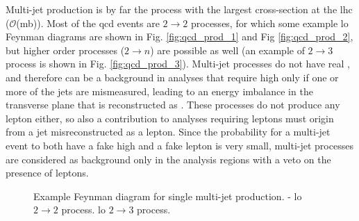 Multi-jet production is by far the process with the largest cross-section at the \gls{lhc} ($\mathcal{O}$(mb)). 
Most of the \gls{qcd} events are $2 \to 2$ processes, for which some example \gls{lo} Feynman diagrams are shown in Fig. \ref{fig:qcd_prod_1} and Fig \ref{fig:qcd_prod_2}, but higher order processes ($2 \to n$) are possible as well (an example of $2 \to 3$ process is shown in Fig. \ref{fig:qcd_prod_3}). 
Multi-jet processes do not have real \met, and therefore can be a background in analyses that require high \met only if one or more of the jets are mismeasured, leading to an energy imbalance in the transverse plane that is reconstructed as \met. 
These processes do not produce any lepton either, so also a contribution to analyses requiring leptons must origin from a jet misreconstructed as a lepton. 
Since the probability for a multi-jet event to both have a fake high \met and a fake lepton is very small, multi-jet processes are considered as background only in the analysis regions with a veto on the presence of leptons. 


\begin{figure}[h]
\centering 
{}
\caption{Example Feynman diagram for single multi-jet production. - \gls{lo} $2 \to 2$ process. 
 \gls{lo} $2 \to 3$ process.}\label{fig:qcd_prod}
\end{figure}


